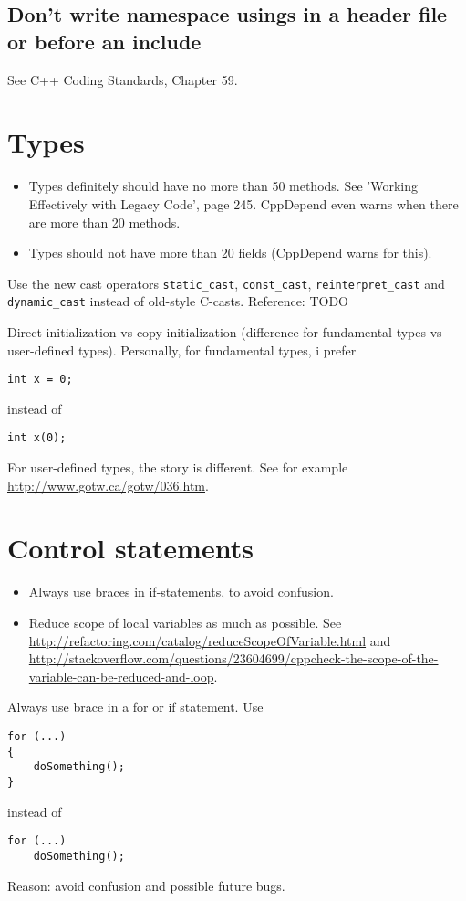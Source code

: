 \documentclass{article}
\begin{document}
\subsection{Don't write namespace usings in a header file or before an include}
See C++ Coding Standards, Chapter 59.

\section{Types}

\begin{itemize}
\item Types definitely should have no more than 50 methods.
See 'Working Effectively with Legacy Code', page 245.
CppDepend even warns when there are more than 20 methods.
\item Types should not have more than 20 fields (CppDepend warns for this).
\end{itemize}

Use the new cast operators \lstinline{static_cast}, \lstinline{const_cast}, \lstinline{reinterpret_cast} and \lstinline{dynamic_cast} instead of old-style C-casts.
Reference: TODO

Direct initialization vs copy initialization (difference for fundamental types vs user-defined types).  Personally, for fundamental types, i prefer
\begin{lstlisting}
int x = 0;
\end{lstlisting}
instead of
\begin{lstlisting}
int x(0);
\end{lstlisting}
For user-defined types, the story is different.  See for example \url{http://www.gotw.ca/gotw/036.htm}.

\section{Control statements}

\begin{itemize}
\item Always use braces in if-statements, to avoid confusion.
\item Reduce scope of local variables as much as possible.  See \url{http://refactoring.com/catalog/reduceScopeOfVariable.html} and \url{http://stackoverflow.com/questions/23604699/cppcheck-the-scope-of-the-variable-can-be-reduced-and-loop}.
\end{itemize}

Always use brace in a for or if statement.  Use
\begin{lstlisting}
for (...)
{
    doSomething();
}
\end{lstlisting}
instead of
\begin{lstlisting}
for (...)
    doSomething();
\end{lstlisting}
Reason: avoid confusion and possible future bugs.
\end{document}
